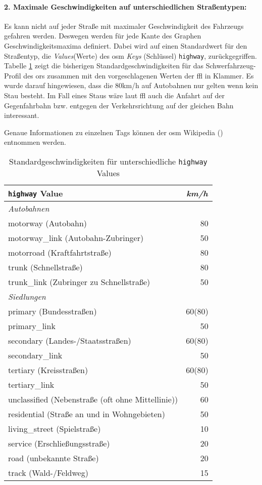 \paragraph*{2. Maximale Geschwindigkeiten auf unterschiedlichen Straßentypen:}
\label{frage2}
\par
Es kann nicht auf jeder Straße mit maximaler Geschwindigkeit des Fahrzeugs gefahren werden.
Deswegen werden für jede Kante des Graphen Geschwindigkeitsmaxima definiert.
Dabei wird auf einen Standardwert für den Straßentyp, die \textit{Values}(Werte) des \gls{osm} \textit{Keys} (Schlüssel) \texttt{highway}, zurückgegriffen.
Tabelle \ref{tab:speedinfo} zeigt die bisherigen Standardgeschwindigkeiten für das Schwerfahrzeug-Profil des \gls{ors} zusammen mit den vorgeschlagenen Werten der \gls{ffl} in Klammer.
Es wurde darauf hingewiesen, dass die 80km/h auf Autobahnen nur gelten wenn kein Stau besteht.
Im Fall eines Staus wäre laut \gls{ffl} auch die Anfahrt auf der Gegenfahrbahn bzw. entgegen der Verkehrsrichtung auf der gleichen Bahn interessant.

Genaue Informationen zu einzelnen Tags können der \gls{osm} Wikipedia (\cite{osmwiki}) entnommen werden.

\begin{table}[h]
\centering
\caption{Standardgeschwindigkeiten für unterschiedliche \texttt{highway} Values}
\label{tab:speedinfo}
\begin{tabular}{|l|r|}
\hline
\multicolumn{1}{|l|}{\texttt{highway} Value} & \multicolumn{1}{c|}{\textit{km/h}} \\
\hline
\multicolumn{2}{|l|}{\textit{Autobahnen}} \\
\hline
motorway (Autobahn) & 80 \\
motorway\_link (Autobahn-Zubringer) & 50 \\
motorroad (Kraftfahrtstraße) & 80 \\
trunk (Schnellstraße) & 80 \\
trunk\_link (Zubringer zu Schnellstraße) & 50 \\
\hline
\multicolumn{1}{|l}{\textit{Siedlungen}} & \multicolumn{1}{l|}{ } \\
\hline
primary (Bundesstraßen) & 60(80) \\
primary\_link  & 50 \\
secondary (Landes-/Staatsstraßen) & 60(80) \\
secondary\_link  & 50 \\
tertiary (Kreisstraßen) & 60(80) \\
tertiary\_link  & 50 \\
unclassified (Nebenstraße (oft ohne Mittellinie))  & 60 \\
residential (Straße an und in Wohngebieten) & 50 \\
living\_street (Spielstraße)  & 10 \\
service (Erschließungsstraße) & 20 \\
road (unbekannte Straße) & 20 \\
track (Wald-/Feldweg) & 15 \\
\hline
\end{tabular}
\end{table}

